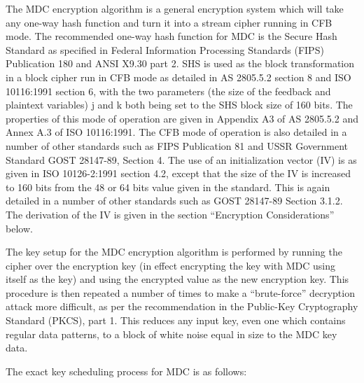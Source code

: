 The MDC encryption algorithm is a general encryption system which will take any
one-way hash function and turn it into a stream cipher running in CFB mode.  The 
recommended one-way hash function for MDC is the Secure Hash Standard as
specified in Federal Information Processing Standards (FIPS) Publication 180
and ANSI X9.30 part 2.  SHS is used as the block transformation in a block 
cipher run in CFB mode as detailed in AS 2805.5.2 section 8 and ISO 10116:1991 
section 6, with the two parameters (the size of the feedback and plaintext 
variables) j and k both being set to the SHS block size of 160 bits.  The 
properties of this mode of operation are given in Appendix A3 of AS 2805.5.2 
and Annex A.3 of ISO 10116:1991.  The CFB mode of operation is also detailed in 
a number of other standards such as FIPS Publication 81 and USSR Government 
Standard GOST 28147-89, Section 4.  The use of an initialization vector (IV) is 
as given in ISO 10126-2:1991 section 4.2, except that the size of the IV is 
increased to 160 bits from the 48 or 64 bits value given in the standard. This 
is again detailed in a number of other standards such as GOST 28147-89 Section 
3.1.2.  The derivation of the IV is given in the section ``Encryption 
Considerations'' below.

The key setup for the MDC encryption algorithm is performed by running the
cipher over the encryption key (in effect encrypting the key with MDC using
itself as the key) and using the encrypted value as the new encryption key.
This procedure is then repeated a number of times to make a ``brute-force''
decryption attack more difficult, as per the recommendation in the Public-Key
Cryptography Standard (PKCS), part 1.  This reduces any input key, even one
which contains regular data patterns, to a block of white noise equal in size
to the MDC key data.

The exact key scheduling process for MDC is as follows:

